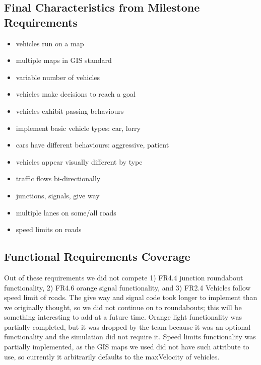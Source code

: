 \documentclass[11pt]{article}
\begin{document}
\begin{enumerate}
\subsection{Final Characteristics from Milestone Requirements}
\begin{itemize}
\item vehicles run on a map
\item multiple maps in GIS standard
\item variable number of vehicles
\item vehicles make decisions to reach a goal
\item vehicles exhibit passing behaviours 
\item implement basic vehicle types: car, lorry
\item cars have different behaviours: aggressive, patient
\item vehicles appear visually different by type
\item traffic flows bi-directionally
\item junctions, signals, give way 
\item multiple lanes on some/all roads
\item speed limits on roads
\end{itemize}



\subsection{Functional Requirements Coverage}

Out of these requirements we did not compete 1) FR4.4 junction roundabout functionality, 2) FR4.6 orange signal functionality, and 3) FR2.4 Vehicles follow speed limit of roads. The give way and signal code took longer to implement than we originally thought, so we did not continue on to roundabouts; this will be something interesting to add at a future time. Orange light functionality was partially completed, but it was dropped by the team because it was an optional functionality and the simulation did not require it. Speed limits functionality was partially implemented, as the GIS maps we used did not have such attribute to use, so currently it arbitrarily defaults to the maxVelocity of vehicles.



\end{enumerate}
\end{document}

